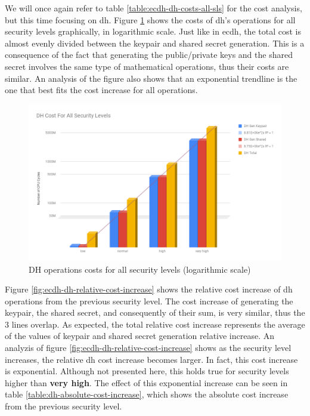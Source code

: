 \documentclass{llncs}
\begin{document}
We will once again refer to table \ref{table:ecdh-dh-costs-all-sls} for the cost analysis, but this time focusing on \gls{dh}. Figure
\ref{fig:dh-costs-all-sls} shows the costs of \gls{dh}'s operations for all security levels graphically, in logarithmic scale. Just like in \gls{ecdh}, the total cost
is almost evenly divided between the keypair and shared secret generation. This is a consequence of the fact that generating the public/private keys
and the shared secret involves the same type of mathematical operations, thus their costs are similar. An analysis of the figure
also shows that an exponential trendline is the one that best fits the cost increase for all operations.

  \begin{figure}
    \centering
    \includegraphics[width=1.0\textwidth]{img/dh_costs_all_sls.png}
    \centering \caption{\label{fig:dh-costs-all-sls} DH operations costs for all security levels (logarithmic scale)}
  \end{figure}

Figure \ref{fig:ecdh-dh-relative-cost-increase} shows the relative cost increase of \gls{dh} operations from the previous security level.
The cost increase of generating the keypair, the shared secret, and consequently of their sum, is very similar, thus the $3$ lines overlap.
As expected, the total relative cost increase represents the average of the values of keypair and shared secret generation relative increase.
An analyzis of figure \ref{fig:ecdh-dh-relative-cost-increase} shows as the security level increases, the relative 
\gls{dh} cost increase becomes larger. In fact, this cost increase is exponential. Although not presented here, this holds true for 
security levels higher than \textbf{very high}. The effect of this exponential increase can be seen in table 
\ref{table:dh-absolute-cost-increase}, which shows the absolute cost increase from the previous security level.
\end{document}
